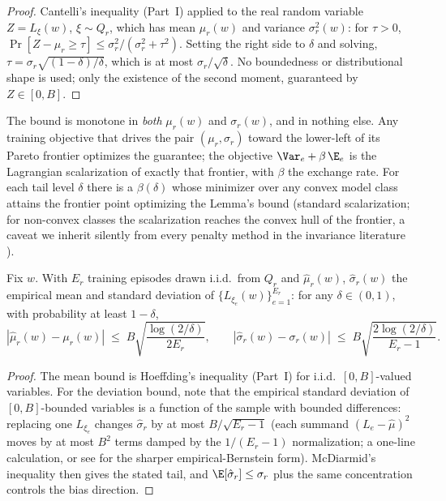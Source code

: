 \begin{proof}
Cantelli's inequality (Part~I) applied to the real random variable
$Z = L_\xi(w)$, $\xi \sim Q_r$, which has mean $\mu_r(w)$ and variance
$\sigma_r^2(w)$: for $\tau > 0$,
$\Pr[Z - \mu_r \ge \tau] \le \sigma_r^2 / (\sigma_r^2 + \tau^2)$.
Setting the right side to $\delta$ and solving,
$\tau = \sigma_r \sqrt{(1-\delta)/\delta}$, which is at most
$\sigma_r / \sqrt{\delta}$. No boundedness or distributional shape is
used; only the existence of the second moment, guaranteed by
$Z \in [0, B]$.
\end{proof}

\begin{keypoint}
The bound is monotone in \emph{both} $\mu_r(w)$ and $\sigma_r(w)$, and in
nothing else. Any training objective that drives the pair
$(\mu_r, \sigma_r)$ toward the lower-left of its Pareto frontier
optimizes the guarantee; the \nm{} objective
$\Var_e + \beta\,\E_e$ is the Lagrangian scalarization of exactly that
frontier, with $\beta$ the exchange rate. For each tail level $\delta$
there is a $\beta(\delta)$ whose minimizer over any convex model class
attains the frontier point optimizing the Lemma's bound (standard
scalarization; for non-convex classes the scalarization reaches the
convex hull of the frontier, a caveat we inherit silently from every
penalty method in the invariance literature \cite{krueger2021rex}).
\end{keypoint}

\begin{lemma}
\label{lem:dd4-estimation}
Fix $w$. With $E_r$ training episodes drawn i.i.d.\ from $Q_r$ and
$\hat\mu_r(w)$, $\hat\sigma_r(w)$ the empirical mean and standard
deviation of $\{L_{\xi_e}(w)\}_{e=1}^{E_r}$: for any
$\delta \in (0, 1)$, with probability at least $1 - \delta$,
\[
  |\hat\mu_r(w) - \mu_r(w)| \;\le\; B \sqrt{\frac{\log(2/\delta)}{2 E_r}},
  \qquad
  |\hat\sigma_r(w) - \sigma_r(w)| \;\le\; B \sqrt{\frac{2 \log(2/\delta)}{E_r - 1}} .
\]
\end{lemma}

\begin{proof}
The mean bound is Hoeffding's inequality (Part~I) for i.i.d.\
$[0, B]$-valued variables. For the deviation bound, note that the
empirical standard deviation of $[0,B]$-bounded variables is a function
of the sample with bounded differences: replacing one $L_{\xi_e}$ changes
$\hat\sigma_r$ by at most $B / \sqrt{E_r - 1}$ (each summand
$(L_e - \hat\mu)^2$ moves by at most $B^2$ terms damped by the
$1/(E_r{-}1)$ normalization; a one-line calculation, or see
\cite{maurer2009empirical} for the sharper empirical-Bernstein form).
McDiarmid's inequality then gives the stated tail, and
$\E[\hat\sigma_r] \le \sigma_r$ plus the same concentration controls the
bias direction.
\end{proof}

